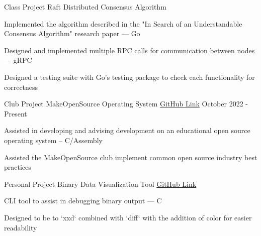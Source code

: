 

\begin{cventries}

  \cventry
    {Class Project} %
    {Raft Distributed Consensus Algorithm} %
    {} %
    {} %
    {
      \begin{cvitems} %
        \item Implemented the algorithm described in the "In Search of an Understandable Consensus Algorithm" research paper --- Go 
	\item Designed and implemented multiple RPC calls for communication between nodes --- gRPC
    \item Designed a testing suite with Go's testing package to check each functionality for correctness
      \end{cvitems}
    }


  \cventry
    {Club Project} %
    {MakeOpenSource Operating System} %
    {\href{https://github.com/makeopensource/mOS}{GitHub Link}} %
    {October 2022 - Present} %
    {
      \begin{cvitems} %
        \item Assisted in developing and advising development on an educational open source operating system -- C/Assembly
        \item Assisted the MakeOpenSource club implement common open source industry best practices
      \end{cvitems}
    }
  \cventry
    {Personal Project} %
    {Binary Data Visualization Tool} %
    {\href{https://github.com/shawnz99/bdt}{GitHub Link}} %
    {} %
    {
      \begin{cvitems} %
        \item CLI tool to assist in debugging binary output --- C
        \item Designed to be to `xxd` combined with `diff` with the addition of color for easier readability
      \end{cvitems}
    }



\end{cventries}
